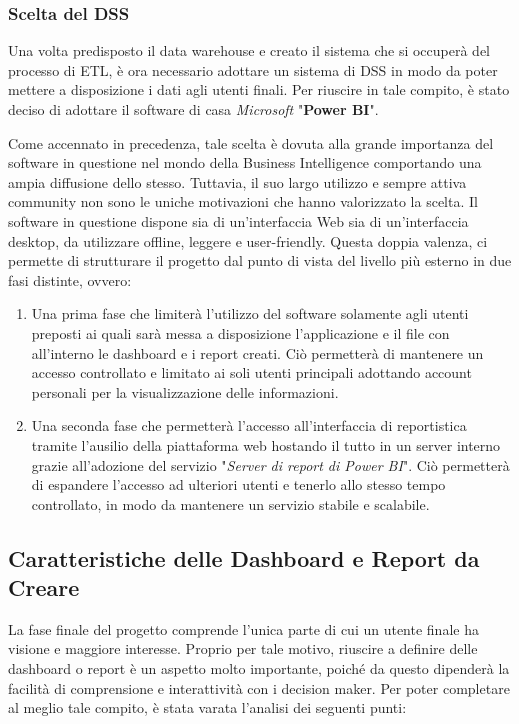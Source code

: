 \subsubsection{Scelta del DSS}

Una volta predisposto il data warehouse e creato il sistema che si occuperà del processo di ETL, è ora necessario adottare un sistema di DSS in modo da poter mettere a disposizione i dati agli utenti finali. Per riuscire in tale compito, è stato deciso di adottare il software di casa \textit{Microsoft} "\textbf{Power BI}". 

Come accennato in precedenza, tale scelta è dovuta alla grande importanza del software in questione nel mondo della Business Intelligence comportando una ampia diffusione dello stesso. Tuttavia, il suo largo utilizzo e sempre attiva community non sono le uniche motivazioni che hanno valorizzato la scelta. Il software in questione dispone sia di un'interfaccia Web sia di un'interfaccia desktop, da utilizzare offline, leggere e user-friendly. Questa doppia valenza, ci permette di strutturare il progetto dal punto di vista del livello più esterno in due fasi distinte, ovvero: 

\begin{enumerate}
    \item Una prima fase che limiterà l'utilizzo del software solamente agli utenti preposti ai quali sarà messa a disposizione l'applicazione e il file con all'interno le dashboard e i report creati. Ciò permetterà di mantenere un accesso controllato e limitato ai soli utenti principali adottando account personali per la visualizzazione delle informazioni.
    \item Una seconda fase che permetterà l'accesso all'interfaccia di reportistica tramite l'ausilio della piattaforma web hostando il tutto in un server interno grazie all'adozione del servizio "\textit{Server di report di Power BI}". Ciò permetterà di espandere l'accesso ad ulteriori utenti e tenerlo allo stesso tempo controllato, in modo da mantenere un servizio stabile e scalabile.
\end{enumerate}

\subsection{Caratteristiche delle Dashboard e Report da Creare}

La fase finale del progetto comprende l'unica parte di cui un utente finale ha visione e maggiore interesse. Proprio per tale motivo, riuscire a definire delle dashboard o report è un aspetto molto importante, poiché da questo dipenderà la facilità di comprensione e interattività con i decision maker. Per poter completare al meglio tale compito, è stata varata l'analisi dei seguenti punti:


